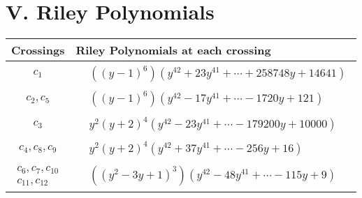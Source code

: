\documentclass[1p]{elsarticle_modified}
\theoremstyle{definition}
\begin{document}
\centering \section*{ V. Riley Polynomials}
\begin{tabular}{m{50pt}|m{274pt}}
Crossings & \hspace{64pt}Riley Polynomials at each crossing \\
\hline $$\begin{aligned}c_{1}\end{aligned}$$&$\begin{aligned}
&((y-1)^6)(y^{42}+23 y^{41}+\cdots+258748 y+14641)
\end{aligned}$\\
\hline $$\begin{aligned}c_{2},c_{5}\end{aligned}$$&$\begin{aligned}
&((y-1)^6)(y^{42}-17 y^{41}+\cdots-1720 y+121)
\end{aligned}$\\
\hline $$\begin{aligned}c_{3}\end{aligned}$$&$\begin{aligned}
&y^2(y+2)^4(y^{42}-23 y^{41}+\cdots-179200 y+10000)
\end{aligned}$\\
\hline $$\begin{aligned}c_{4},c_{8},c_{9}\end{aligned}$$&$\begin{aligned}
&y^2(y+2)^4(y^{42}+37 y^{41}+\cdots-256 y+16)
\end{aligned}$\\
\hline $$\begin{aligned}c_{6},c_{7},c_{10}\\c_{11},c_{12}\end{aligned}$$&$\begin{aligned}
&((y^2-3 y+1)^3)(y^{42}-48 y^{41}+\cdots-115 y+9)
\end{aligned}$\\
\hline
\end{tabular}
\vskip 2pc
\end{document}
